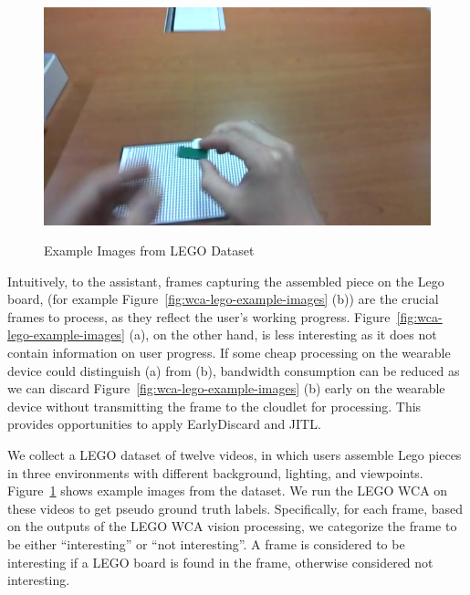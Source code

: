 \begin{figure}
\begin{minipage}[]{0.31\linewidth}
\end{minipage}
\begin{minipage}[]{0.31\linewidth}
\centering
\includegraphics[width=\linewidth]{FIGS/lego-dataset-3}\\
\end{minipage}
\caption{Example Images from LEGO Dataset}
\label{fig:wca-lego-dataset}
\end{figure}

Intuitively, to the assistant, frames capturing the assembled piece on the Lego
board, (for example Figure~\ref{fig:wca-lego-example-images} (b)) are the
crucial frames to process, as they reflect the user's working progress.
Figure~\ref{fig:wca-lego-example-images} (a), on the other hand, is less
interesting as it does not contain information on user progress. If some cheap
processing on the wearable device could distinguish
(a) from (b), bandwidth consumption can be
reduced as we can discard Figure~\ref{fig:wca-lego-example-images} (b) early on
the wearable device without transmitting the frame to the cloudlet for processing.
This provides opportunities to apply EarlyDiscard and JITL.

We collect a LEGO dataset of twelve videos, in which users assemble Lego pieces
in three environments with different background, lighting, and viewpoints.
Figure~\ref{fig:wca-lego-dataset} shows example images from the dataset. We run
the LEGO WCA on these videos to get pseudo ground truth labels. Specifically,
for each frame, based on the outputs of the LEGO WCA vision processing, we
categorize the frame to be either ``interesting'' or ``not interesting''. A
frame is considered to be interesting if a LEGO board is found in the frame,
otherwise considered not interesting. 

